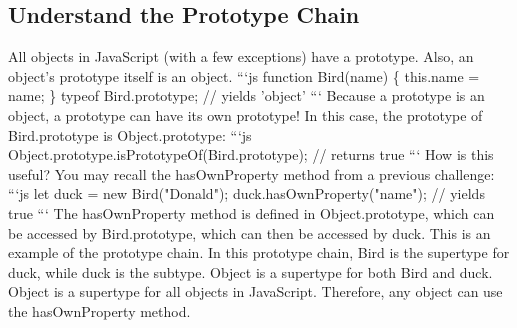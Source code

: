 \documentclass{article}%
\begin{document}
\subsection{Understand the Prototype Chain}%
\label{subsec:UnderstandthePrototypeChain}%
All objects in JavaScript (with a few exceptions) have a prototype. Also, an object’s prototype itself is an object.\newline%
```js\newline%
function Bird(name) \{\newline%
  this.name = name;\newline%
\}\newline%
typeof Bird.prototype; // yields 'object'\newline%
```\newline%
Because a prototype is an object, a prototype can have its own prototype! In this case, the prototype of Bird.prototype is Object.prototype:\newline%
```js\newline%
Object.prototype.isPrototypeOf(Bird.prototype); // returns true\newline%
```\newline%
How is this useful? You may recall the hasOwnProperty method from a previous challenge:\newline%
```js\newline%
let duck = new Bird("Donald");\newline%
duck.hasOwnProperty("name"); // yields true\newline%
```\newline%
The hasOwnProperty method is defined in Object.prototype, which can be accessed by Bird.prototype, which can then be accessed by duck. This is an example of the prototype chain.\newline%
In this prototype chain, Bird is the supertype for duck, while duck is the subtype. Object is a supertype for both Bird and duck.\newline%
Object is a supertype for all objects in JavaScript. Therefore, any object can use the hasOwnProperty method.\newline%

%
\end{document}
